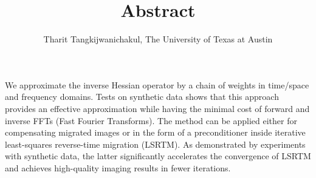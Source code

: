 \author{Tharit Tangkijwanichakul, The University of Texas at Austin}
\title{Abstract}
\label{ch:abs}
We approximate the inverse Hessian operator by a chain of weights in time/space and frequency domains. Tests on synthetic data shows that this approach provides an effective approximation while having the minimal cost of forward and inverse FFTs (Fast Fourier Transforms). The method can be applied either for compensating migrated images or in the form of a preconditioner inside iterative least-squares reverse-time migration (LSRTM). As demonstrated by experiments with synthetic data, the latter significantly accelerates the convergence of LSRTM and achieves high-quality imaging results in fewer iterations.